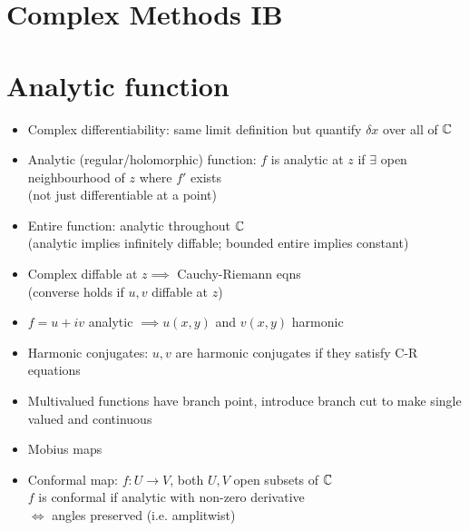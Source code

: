 


\section*{Complex Methods \hfill IB}

\section{Analytic function}

\begin{itemize}
    \item Complex differentiability: same limit definition but quantify $\delta x$ over all of $\mathbb{C}$
    \item Analytic (regular/holomorphic) function: $f$ is analytic at $z$ if $\exists$ open neighbourhood of $z$ where $f'$ exists \\ (not just differentiable at a point)
    \item Entire function: analytic throughout $\mathbb{C}$ \\(analytic implies infinitely diffable; bounded entire implies constant)
    \item Complex diffable at $z \implies$ Cauchy-Riemann eqns \\ (converse holds if $u,v$ diffable at $z$)
    \item $f = u+iv$ analytic $\implies u(x,y)$ and $v(x,y)$ harmonic
    \item Harmonic conjugates: $u,v$ are harmonic conjugates if they satisfy C-R equations
    \item Multivalued functions have branch point, introduce branch cut to make single valued and continuous

    \item Mobius maps

    \item Conformal map: $f: U \to V$, both $U,V$ open subsets of $\mathbb{C}$\\
          $f$ is conformal if analytic with non-zero derivative\\
          $\iff$ angles preserved (i.e. amplitwist)
\end{itemize}
